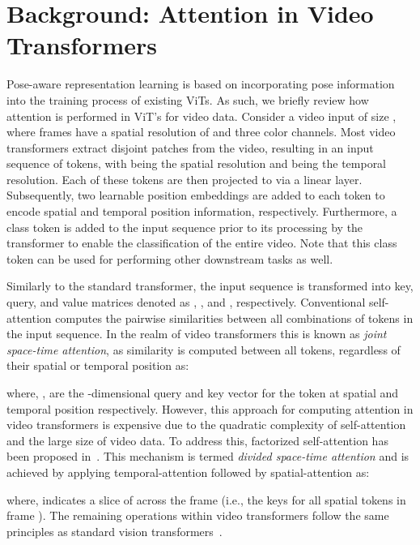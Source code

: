 \documentclass{article}
\begin{document}
\section{Background: Attention in Video Transformers}
Pose-aware representation learning is based on incorporating pose information into the training process of existing ViTs. As such, we briefly review how attention is performed in ViT's for video data.
Consider a video input of size , where  frames have a spatial resolution of  and three color channels. Most video transformers \cite{Selva2022video_transformer_survey} extract disjoint patches from the video, resulting in an input sequence of  tokens, with  being the spatial resolution and  being the temporal resolution. Each of these tokens are then projected to  via a linear layer. Subsequently, two learnable position embeddings are added to each token to encode spatial and temporal position information, respectively. Furthermore, a class token is added to the input sequence prior to its processing by the transformer to enable the classification of the entire video. Note that this class token can be used for performing other downstream tasks as well.







Similarly to the standard transformer, the input sequence is transformed into key, query, and value matrices denoted as , , and , respectively. Conventional self-attention \cite{attention} computes the pairwise similarities between all combinations of tokens in the input sequence. In the realm of video transformers this is known as \textit{joint space-time attention}, as similarity is computed between all tokens, regardless of their spatial or temporal position as: \vspace{-0.025in}

where, ,  are the -dimensional query and key vector for the token at spatial and temporal position  respectively. However, this approach for computing attention in video transformers is expensive due to the quadratic complexity of self-attention and the large size of video data. To address this, factorized self-attention has been proposed in~\cite{timesformer}. This mechanism is termed \textit{divided space-time attention} and is achieved by applying temporal-attention followed by spatial-attention as: \vspace{-0.05in}


where,  indicates a slice of  across the  frame (i.e., the keys for all spatial tokens in frame ). The remaining operations within video transformers follow the same principles as standard vision transformers~\cite{dosovitskiy2020vit}.
\end{document}
